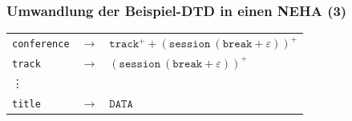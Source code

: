 \begin{frame}[t]
      \par\medskip

    \end{frame}

  \newcommand{\zust}[1]{\texttt{\textsl{#1}}}
    \begin{frame}[t]
      \frametitle{Umwandlung der Beispiel-DTD in einen NEHA (3)}
      
      \par\vspace*{-2pt}
      \begin{exampleblock}{}
        \begin{footnotesize}
          \begin{center}
            \begin{tabular}{@{}lcl@{}}
              \texttt{conference} & $\to$ & $\texttt{track}^+ + (\texttt{session}~(\texttt{break} + \varepsilon))^+$ \\
              \texttt{track}      & $\to$ & $(\texttt{session}~(\texttt{break} + \varepsilon))^+$                    \\[-2pt]
              \quad\vdots         &       &                                                                          \\
              \texttt{title}      & $\to$ & $\texttt{DATA}$
            \end{tabular}
          \end{center}
          \par
        \end{footnotesize}
      \end{exampleblock}
      

\end{frame}
